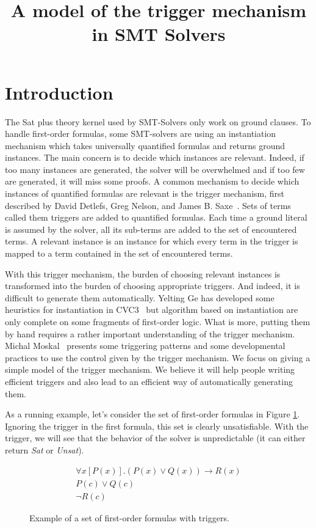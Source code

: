 \documentclass[a4paper,11pt]{article}
\title{A model of the trigger mechanism in SMT Solvers}
\author{}
\begin{document}
\maketitle

\begin{abstract}

\end{abstract}

\section{Introduction}
The Sat plus theory kernel used by SMT-Solvers only work on ground clauses. To handle first-order formulas,
some SMT-solvers are using an instantiation mechanism
which takes universally quantified formulas and returns ground instances. The main concern is to
decide which instances are relevant. Indeed, if too many instances are generated, the solver will be
overwhelmed and if too few are generated, it will miss some proofs. A common mechanism to decide
which instances of quantified formulas are relevant is the trigger mechanism, first described
by David Detlefs, Greg Nelson, and James B. Saxe~\cite{simplify}.
Sets of terms called them triggers are added to quantified formulas.
Each time a ground literal is assumed by the solver, all its sub-terms are
added to the set of encountered terms. A relevant instance is an instance for which every term
in the trigger is mapped to a term contained in the set of encountered terms.

With this trigger mechanism, the burden of choosing relevant instances is transformed into the
burden of choosing appropriate triggers. And indeed, it is difficult to generate them
automatically. Yelting Ge has developed some heuristics for instantiation in CVC3~\cite{Ge-2010}
but algorithm based on instantiation are only complete on some fragments of first-order logic.
What is more, putting them by hand requires a rather important understanding of the
trigger mechanism. Michal Moskal~\cite{moskal-2009} presents some triggering patterns and some
developmental practices to use the control given by the trigger mechanism.
We focus on giving a simple model of the trigger mechanism.
We believe it will help people writing efficient triggers and also lead to an efficient way
of automatically generating them.

As a running example, let's consider the set of first-order formulas in Figure \ref{fo-ex}.
Ignoring the trigger in the first formula, this set is clearly unsatisfiable. With the trigger,
we will see that the behavior of the solver is unpredictable (it can either return \emph{Sat}
or \emph{Unsat}).
\begin{figure}
 \begin{eqnarray*}
 \forall x[P(x)]. (P(x)\vee Q(x))\rightarrow R(x)\\
 P(c)\vee Q(c)\\
 \neg R(c)
\end{eqnarray*}
\caption{\label{fo-ex}Example of a set of first-order formulas with triggers.}
\end{figure}
\end{document}
